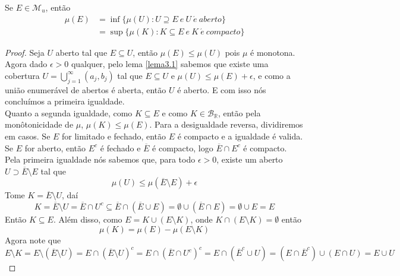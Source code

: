 \begin{teorema} \label{3.2}
    Se $E \in \mathcal{M}_u$, então 
    \begin{align*}
        \mu(E) &= \inf \{ \mu(U) : U \supseteq E \ e \ U \ \acute{e}  \ aberto \} \\
               &= \sup \{ \mu(K) : K \subseteq E \ e \ K \ \acute{e} \ compacto \} 
    \end{align*}

    \begin{proof}
        Seja $U$ aberto tal que $E \subseteq U$, então $\mu(E) \leq \mu(U)$ pois $\mu$ é monotona. Agora dado $\epsilon>0$ qualquer, pelo lema \ref{lema3.1} sabemos que existe uma cobertura $U = \bigcup_{j=1}^\infty (a_j,b_j)$ tal que $E \subseteq U$ e $\mu(U) \leq \mu(E) + \epsilon$, e como a união enumerável de abertos é aberta, então $U$ é aberto. E com isso nós concluímos a primeira igualdade. \\
        Quanto a segunda igualdade, como $K \subseteq E$ e como $K \in \mathcal{B}_\mathbb{R}$, então pela monôtonicidade de $\mu$, $\mu(K) \leq \mu(E)$. Para a desigualdade reversa, dividiremos em casos. Se $E$ for limitado e fechado, então $E$ é compacto e a igualdade é valida. Se $E$ for aberto, então $E^c$ é fechado e $\overline{E}$ é compacto, logo $\overline{E} \cap E^c$ é compacto. Pela primeira igualdade nós sabemos que, para todo $\epsilon > 0$, existe um aberto $U \supset \overline{E} \setminus E$ tal que 
        \begin{equation}
            \mu(U) \leq \mu(\overline{E} \setminus E) + \epsilon
            \label{3.2.01}
        \end{equation}
        Tome $K=\overline{E} \setminus U$, daí 
        \[
        K = \overline{E} \setminus U = \overline{E} \cap U^c \subseteq \overline{E} \cap (\overline{E} \cup E) = \emptyset \cup (\overline{E} \cap E) = \emptyset \cup E = E 
        \]
        Então $K \subseteq E$. Além disso, como $E = K \cup (E \setminus K)$, onde $K \cap (E \setminus K) = \emptyset$ então
        \begin{equation}
             \mu(K) = \mu(E) - \mu(E \setminus K)
             \label{3.2.1}  
        \end{equation} 
        Agora note que 
        \begin{equation}
            E \setminus K = E \setminus (\overline{E} \setminus U) = E \cap (\overline{E} \setminus U)^c = E \cap (\overline{E} \cap U ^c)^c = E \cap (\overline{E}^c \cup U) = (E \cap \overline{E}^c) \cup (E \cap U) = E \cup U  

\end{equation}
\end{proof}
\end{teorema}

